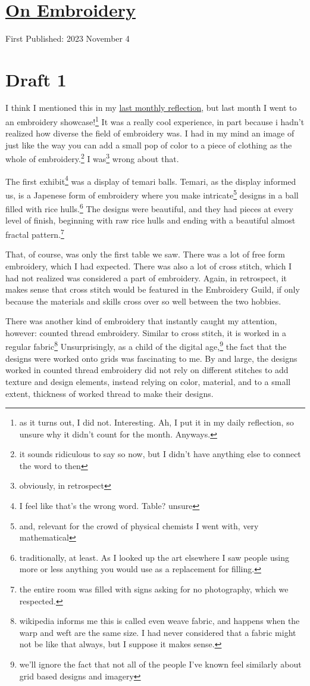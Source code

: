 \documentclass[12pt]{article}[titlepage]
\newcommand{\1}{\={a}}
\newcommand{\2}{\={e}}
\newcommand{\3}{\={\i}}
\newcommand{\4}{\=o}
\newcommand{\5}{\=u}
\newcommand{\6}{\={A}}
\renewcommand{\,}{\textsuperscript{,}}
\begin{document}

\doublespacing
\section{\href{embroidery.html}{On Embroidery}}
First Published: 2023 November 4
\section{Draft 1}
I think I mentioned this in my \href{reflection-october-23.html}{last monthly reflection}, but last month I went to an embroidery showcase!\footnote{as it turns out, I did not. Interesting. Ah, I put it in my daily reflection, so unsure why it didn't count for the month. Anyways.}
It was a really cool experience, in part because i hadn't realized how diverse the field of embroidery was.
I had in my mind an image of just like the way you can add a small pop of color to a piece of clothing as the whole of embroidery.\footnote{it sounds ridiculous to say so now, but I didn't have anything else to connect the word to then}
I was\footnote{obviously, in retrospect} wrong about that.

The first exhibit\footnote{I feel like that's the wrong word. Table? unsure} was a display of temari balls.
Temari, as the display informed us, is a Japenese form of embroidery where you make intricate\footnote{and, relevant for the crowd of physical chemists I went with, very mathematical} designs in a ball filled with rice hulls.\footnote{traditionally, at least. As I looked up the art elsewhere I saw people using more or less anything you would use as a replacement for filling.}
The designs were beautiful, and they had pieces at every level of finish, beginning with raw rice hulls and ending with a beautiful almost fractal pattern.\footnote{the entire room was filled with signs asking for no photography, which we respected.}

That, of course, was only the first table we saw.
There was a lot of free form embroidery, which I had expected.
There was also a lot of cross stitch, which I had not realized was considered a part of embroidery.
Again, in retrospect, it makes sense that cross stitch would be featured in the Embroidery Guild, if only because the materials and skills cross over so well between the two hobbies.

There was another kind of embroidery that instantly caught my attention, however: counted thread embroidery.
Similar to cross stitch, it is worked in a regular fabric\footnote{wikipedia informs me this is called even weave fabric, and happens when the warp and weft are the same size. I had never considered that a fabric might not be like that always, but I suppose it makes sense.}
Unsurprisingly, as a child of the digital age,\footnote{we'll ignore the fact that not all of the people I've known feel similarly about grid based designs and imagery} the fact that the designs were worked onto grids was fascinating to me.
By and large, the designs worked in counted thread embroidery did not rely on different stitches to add texture and design elements, instead relying on color, material, and to a small extent, thickness of worked thread to make their designs.
\end{document}
